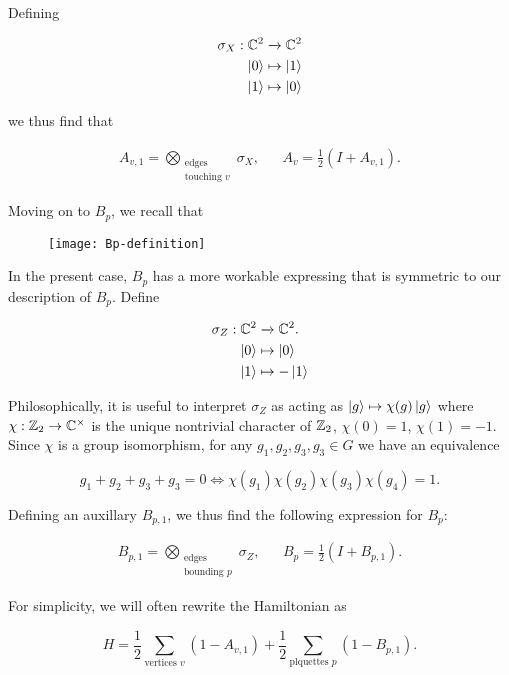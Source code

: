 Defining

\begin{align*}
\sigma_X:\mathbb{C}^2&\xrightarrow{}\mathbb{C}^2\\
\ket{0}&\mapsto \ket{1}\\
\ket{1}&\mapsto \ket{0}
\end{align*}

we thus find that

\begin{align*}
A_{v,1}=\bigotimes_{\substack{\text{edges} \\ \text{touching }v}}\sigma_X, && A_v=\frac{1}{2}\left(I + A_{v,1}\right).
\end{align*}

Moving on to $B_p$, we recall that

\begin{figure}[h]
\begin{center}
\texttt{[image: Bp-definition]}
\end{center}
\end{figure}

In the present case, $B_p$ has a more workable expressing that is symmetric to our description of $B_p$. Define

\begin{align*}
\sigma_Z:\mathbb{C}^2&\xrightarrow{}\mathbb{C}^2.\\
\ket{0}&\mapsto \ket{0}\\
\ket{1}&\mapsto -\ket{1}
\end{align*}

Philosophically, it is useful to interpret $\sigma_Z$ as acting as $\ket{g}\mapsto \chi(g)\ket{g}$ where $\chi:\mathbb{Z}_2\to\mathbb{C}^\times$ is the unique nontrivial character of $\mathbb{Z}_2$, $\chi(0)=1$, $\chi(1)=-1$. Since $\chi$ is a group isomorphism, for any $g_1,g_2,g_3,g_3\in G$ we have an equivalence

$$g_1+g_2+g_3+g_3=0 \iff \chi(g_1)\chi(g_2)\chi(g_3)\chi(g_4)=1.$$

Defining an auxillary $B_{p,1}$, we thus find the following expression for $B_p$:

\begin{align*}
B_{p,1}=\bigotimes_{\substack{\text{edges} \\ \text{bounding }p}}\sigma_Z, && B_p=\frac{1}{2}\left(I + B_{p,1}\right).
\end{align*}

For simplicity, we will often rewrite the Hamiltonian as

$$H=\frac{1}{2}\sum_{\text{vertices }v}(1-A_{v,1})+\frac{1}{2}\sum_{\text{plquettes }p}(1-B_{p,1}).$$


